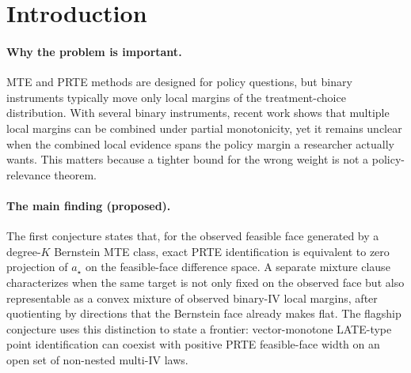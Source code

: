 \documentclass[11pt]{article}
\theoremstyle{definition}
\theoremstyle{plain}
\theoremstyle{remark}
\begin{document}
\begin{abstract}
This proposal asks when several binary instruments with overlapping but non-nested propensity-score supports identify the same Bernstein-projected policy weight as the target PRTE, rather than only a collection of instrument-specific LATE or local MTE averages. The proposed kernel separates two notions that existing LP formulations leave implicit: zero width on the observed Bernstein feasible face, and genuine policy-mixture support by observable binary-IV margins. The flagship conjecture is a frontier result: vector-monotone LATE-type parameters can be point identified in the sense of \citet{Goff2024} while the target PRTE weight still has positive quotient-face residual width in the Bernstein MTE class. If true, the result would tell empirical researchers when adding binary instruments is genuinely policy-relevant rather than merely adding identified local IV evidence. It would also turn the qualitative extrapolation warning in the MTE literature into a computable quotient-rank, mixture-cone, and feasible-face-width diagnostic.
\end{abstract}

\section{Introduction}
\paragraph{Why the problem is important.}
MTE and PRTE methods are designed for policy questions, but binary instruments typically move only local margins of the treatment-choice distribution. With several binary instruments, recent work shows that multiple local margins can be combined under partial monotonicity, yet it remains unclear when the combined local evidence spans the policy margin a researcher actually wants. This matters because a tighter bound for the wrong weight is not a policy-relevance theorem.

\paragraph{The main finding (proposed).}
The first conjecture states that, for the observed feasible face generated by a degree-\(K\) Bernstein MTE class, exact PRTE identification is equivalent to zero projection of \(a_\star\) on the feasible-face difference space. A separate mixture clause characterizes when the same target is not only fixed on the observed face but also representable as a convex mixture of observed binary-IV local margins, after quotienting by directions that the Bernstein face already makes flat. The flagship conjecture uses this distinction to state a frontier: vector-monotone LATE-type point identification can coexist with positive PRTE feasible-face width on an open set of non-nested multi-IV laws.
\end{document}
